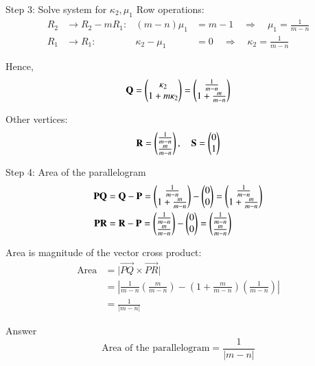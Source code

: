\documentclass{beamer}
\begin{document}
\begin{frame}{Step 3: Solve system for \(\kappa_2, \mu_1\)}
Row operations:
\[
\begin{aligned}
R_2 &\to R_2 - m R_1: & (m - n) \mu_1 &= m - 1 \quad \Rightarrow \quad \mu_1 = \frac{1}{m-n} \\
R_1 &\to R_1: & \kappa_2 - \mu_1 &= 0 \quad \Rightarrow \quad \kappa_2 = \frac{1}{m-n}
\end{aligned}
\]

Hence,
\[
\mathbf{Q} = \begin{pmatrix} \kappa_2 \\ 1 + m \kappa_2 \end{pmatrix} = \begin{pmatrix} \frac{1}{m-n} \\ 1 + \frac{m}{m-n} \end{pmatrix}
\]

Other vertices:
\[
\mathbf{R} = \begin{pmatrix} \frac{1}{m-n} \\ \frac{m}{m-n} \end{pmatrix}, \quad
\mathbf{S} = \begin{pmatrix}0 \\ 1\end{pmatrix}
\]
\end{frame}

\begin{frame}{Step 4: Area of the parallelogram}
\[
\begin{aligned}
\mathbf{PQ} &= \mathbf{Q} - \mathbf{P} = \begin{pmatrix} \frac{1}{m-n} \\ 1 + \frac{m}{m-n} \end{pmatrix} - \begin{pmatrix}0 \\ 0\end{pmatrix} = \begin{pmatrix} \frac{1}{m-n} \\ 1 + \frac{m}{m-n} \end{pmatrix} \\
\mathbf{PR} &= \mathbf{R} - \mathbf{P} = \begin{pmatrix} \frac{1}{m-n} \\ \frac{m}{m-n} \end{pmatrix} - \begin{pmatrix}0 \\ 0\end{pmatrix} = \begin{pmatrix} \frac{1}{m-n} \\ \frac{m}{m-n} \end{pmatrix}
\end{aligned}
\]

Area is magnitude of the vector cross product:
\[
\begin{aligned}
\text{Area} &= \big|\vec{PQ} \times \vec{PR}\big| \\
&= \left| \frac{1}{m-n} \left(\frac{m}{m-n}\right) - \left(1 + \frac{m}{m-n}\right) \left(\frac{1}{m-n}\right) \right| \\
&= \frac{1}{|m-n|}
\end{aligned}
\]
\end{frame}

\begin{frame}{Answer}
\[
\boxed{
\text{Area of the parallelogram} = \frac{1}{|m-n|}
}
\]
\end{frame}
\end{document}
